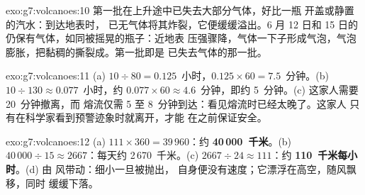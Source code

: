 \begin{solution}{exo:g7:volcanoes:10}
第一批在上升途中已失去大部分气体，好比一瓶
开盖或静置的汽水：到达地表时，
已无气体将其炸裂，它便缓缓溢出。6 月 12 日和
15 日的仍保有气体，如同被摇晃的瓶子：近地表
压强骤降，气体一下子形成气泡，气泡
膨胀，把黏稠的撕裂成。第一批即是
已失去气体的那一批。
\end{solution}

\begin{solution}{exo:g7:volcanoes:11}
(a) $10 \div 80 = 0.125$~小时，$0.125 \times 60 = 7.5$~分钟。(b)
$10 \div 130 \approx 0.077$~小时，约 $0.077 \times 60 \approx
4.6$~分钟，即约 5~分钟。(c) 这家人需要 20~分钟撤离，而
熔流仅需 5 至 8~分钟到达：看见熔流时已经太晚了。这家人
只有在科学家看到预警迹象时就离开，才能
在之前保证安全。
\end{solution}

\begin{solution}{exo:g7:volcanoes:12}
(a) $111 \times 360 = 39\,960$：约 \textbf{40\,000~千米}。(b)
$40\,000 \div 15 \approx 2667$：每天约 2\,670~千米。(c)
$2667 \div 24 \approx 111$：约 \textbf{110~千米每小时}。(d) 由
风带动：细小一旦被抛出，
自身便没有速度；它漂浮在高空，随风飘移，同时
缓缓下落。
\end{solution}

